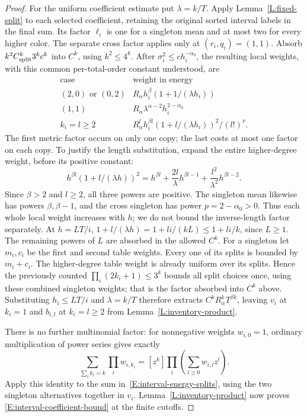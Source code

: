 \documentclass[12pt]{article}
\numberwithin{equation}{section}
\theoremstyle{definition}
\begin{document}
\begin{proof}
  For the uniform coefficient estimate put $\lambda=k/T$.
  Apply Lemma~\ref{L:fixed-split} to each selected coefficient, retaining
  the original sorted interval labels in the final sum.
  Its factor $\ell_i$ is one for a singleton mean and at most two for
  every higher color. The separate cross factor applies only at
  $(r_i,q_i)=(1,1)$.
  Absorb $k^2C_{\rm split}^k3^kc^k$ into $C^k$, using $k^2\le4^k$.
  After $\sigma_i^2\le c h_i^{-\alpha_0}$, the resulting local weights,
  with this common per-total-order constant understood, are
  \[
    \begin{array}{c|c}
      \text{case}&\text{weight in energy}\\ \hline
      (2,0)\text{ or }(0,2)&R_\alpha h_i^\beta
      (1+1/(\lambda h_i))\\
      (1,1)&R_\alpha\lambda^{\alpha-2}h_i^{2-\alpha_0}\\
      k_i=l\ge2&R_\alpha^l h_i^{\beta l}
      (1+l/(\lambda h_i))^2/(l!)^\nu .
    \end{array}
  \]
  The first metric factor occurs on only one copy; the last costs at
  most one factor on each copy. To justify the length substitution,
  expand the entire higher-degree weight, before its positive constant:
  \[
    h^{\beta l}(1+l/(\lambda h))^2
    =h^{\beta l}+\frac{2l}{\lambda}h^{\beta l-1}
    +\frac{l^2}{\lambda^2}h^{\beta l-2}.
  \]
  Since $\beta>2$ and $l\ge2$, all three powers are positive.
  The singleton mean likewise has powers $\beta,\beta-1$, and
  the cross singleton has power $p=2-\alpha_0>0$.
  Thus each whole local weight increases with $h$; we do not bound
  the inverse-length factor separately. At $h=LT/i$,
  $1+l/(\lambda h)=1+li/(kL)\le1+li/k$, since $L\ge1$.
  The remaining powers of $L$ are absorbed in the allowed $C^k$.
  For a singleton let $m_i,c_i$ be the first and second table weights.
  Every one of its splits is bounded by $m_i+c_i$.
  The higher-degree table weight is already uniform over its splits.
  Hence the previously counted $\prod_i(2k_i+1)\le3^k$ bounds all split
  choices once, using these combined singleton weights; that is the factor
  absorbed into $C^k$ above.
  Substituting $h_i\le LT/i$ and $\lambda=k/T$ therefore extracts
  $C^kR_\alpha^kT^{\beta k}$, leaving $v_i$ at $k_i=1$ and
  $b_{i,l}$ at $k_i=l\ge2$ from Lemma~\ref{L:inventory-product}.

  There is no further multinomial factor: for nonnegative weights
  $w_{i,0}=1$, ordinary multiplication of power series gives exactly
  \[
    \sum_{\sum_i k_i=k}\prod_i w_{i,k_i}
    =[z^k]\prod_i\left(\sum_{l\ge0}w_{i,l}z^l\right).
  \]
  Apply this identity to the sum in~\eqref{E:interval-energy-splits},
  using the two singleton alternatives together in $v_i$.
  Lemma~\ref{L:inventory-product} now proves
  \eqref{E:interval-coefficient-bound} at the finite cutoffs.


\end{proof}
\end{document}
